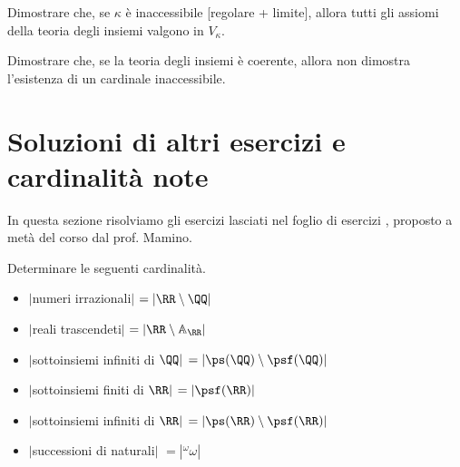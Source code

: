 \documentclass[11pt]{scrartcl}
\begin{document}
\begin{exercise}
	Dimostrare che, se $\kappa$ è inaccessibile [regolare + limite], allora tutti gli assiomi della teoria degli insiemi valgono in $V_\kappa$.
\end{exercise}

\begin{exercise}
	Dimostrare che, se la teoria degli insiemi è coerente, allora non dimostra l'esistenza di un cardinale inaccessibile.
\end{exercise}

\pagebreak
\appendix
\section{Soluzioni di altri esercizi e cardinalità note}
In questa sezione risolviamo gli esercizi lasciati nel foglio di esercizi \cite{mamino_eti_22_23_esercizi}, proposto a metà del corso dal prof. Mamino.

\begin{exercise}
	Determinare le seguenti cardinalità.
\end{exercise}

\begin{itemize}
	\item $|$numeri irrazionali$|$ $= |\RR \setminus \QQ|$
\end{itemize}

\begin{itemize}
	\item $|$reali trascendeti$|$ $= |\RR \setminus \mathbb{A}_{\RR}|$
\end{itemize}

\begin{itemize}
	\item $|$sottoinsiemi infiniti di $\QQ|$ $= |\ps(\QQ) \setminus \psf(\QQ)|$
\end{itemize}

\begin{itemize}
	\item $|$sottoinsiemi finiti di $\RR|$ $= |\psf(\RR)|$
\end{itemize}

\begin{itemize}
	\item $|$sottoinsiemi infiniti di $\RR|$ $= |\ps(\RR)\setminus\psf(\RR)|$
\end{itemize}

\begin{itemize}
	\item $|$successioni di naturali$|$ $= |{}^\omega \omega|$
\end{itemize}
\end{document}
